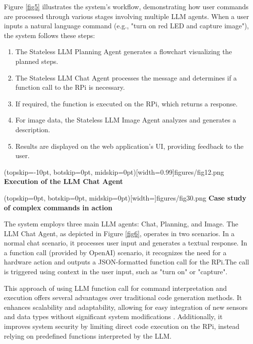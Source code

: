 \documentclass{ieeeaccess}
\begin{document}
Figure \ref{fig5} illustrates the system's workflow, demonstrating how user commands are processed through various stages involving multiple LLM agents. When a user inputs a natural language command (e.g., "turn on red LED and capture image"), the system follows these steps:

\begin{enumerate}
    \item The Stateless LLM Planning Agent generates a flowchart visualizing the planned steps.
    \item The Stateless LLM Chat Agent processes the message and determines if a function call to the RPi is necessary.
    \item If required, the function is executed on the RPi, which returns a response.
    \item For image data, the Stateless LLM Image Agent analyzes and generates a description.
    \item Results are displayed on the web application's UI, providing feedback to the user.
\end{enumerate}

\Figure[b!](topskip=-10pt, botskip=0pt,
midskip=0pt)[width=0.99\columnwidth]{{figures/fig12.png}}
{ \textbf{Execution of the LLM Chat Agent}\label{fig6}}

\Figure[t!](topskip=0pt, botskip=0pt,
midskip=0pt)[width=\textwidth]{{figures/fig30.png}}
{ \textbf{Case study of complex commands in action}\label{fig7}}

The system employs three main LLM agents: Chat, Planning, and Image. The LLM Chat Agent, as depicted in Figure \ref{fig6}, operates in two scenarios. In a normal chat scenario, it processes user input and generates a textual response. In a function call (provided by OpenAI) scenario, it recognizes the need for a hardware action and outputs a JSON-formatted function call for the RPi.The call is triggered using context in the user input, such as "turn on" or "capture".

This approach of using LLM function call for command interpretation and execution offers several advantages over traditional code generation methods. It enhances scalability and adaptability, allowing for easy integration of new sensors and data types without significant system modifications \cite{yang2023autogptonlinedecisionmaking}. Additionally, it improves system security by limiting direct code execution on the RPi, instead relying on predefined functions interpreted by the LLM.
\end{document}
